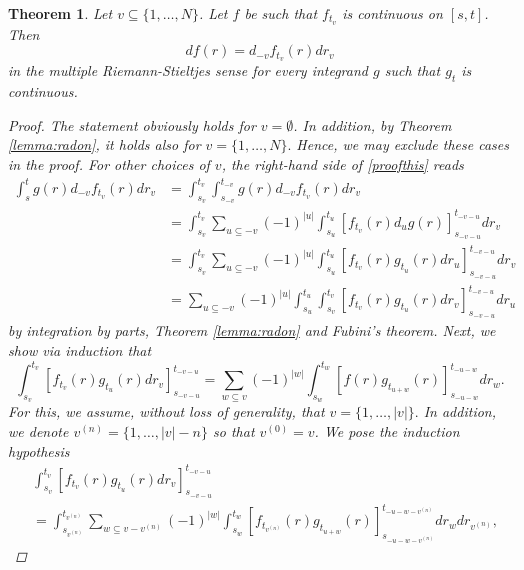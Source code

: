 \documentclass[english, a4paper, 12pt,reqno]{amsart}
\newtheorem{theorem}[defi]{Theorem}
\begin{document}
\begin{theorem}
\label{theorem:radon2}
Let $v\subseteq \{1,\dots,N\}$. Let $f$ be such that $f_{t_v}$ is continuous on $[s,t]$. Then
\begin{equation}
\label{proofthis}
d f(r) = d_{-v}f_{t_v}(r)dr_v
\end{equation}
in the multiple Riemann-Stieltjes sense for every integrand $g$ such that $g_t$ is continuous. 
\begin{proof}
The statement obviously holds for $v=\emptyset$. In addition, by Theorem \ref{lemma:radon}, it holds also for $v = \{1,\dots,N\}.$ Hence, we may exclude these cases in the proof. For other choices of $v$, the right-hand side of \eqref{proofthis} reads
\begin{equation}
\label{substitutehere}
\begin{split}
\int_s^t g(r) d_{-v} f_{t_v} (r) dr_v &= \int_{s_v}^{t_v} \int_{s_{-v}}^{t_{-v}} g(r) d_{-v} f_{t_v} (r) dr_v\\
&= \int_{s_v}^{t_v} \sum_{u\subseteq -v} (-1)^{|u|} \int_{s_u}^{t_u} \left[ f_{t_v}(r) d_u g(r)\right]_{s_{-v-u}}^{t_{-v-u}} dr_v\\
&= \int_{s_v}^{t_v} \sum_{u\subseteq -v} (-1)^{|u|} \int_{s_u}^{t_u} \left[ f_{t_v}(r) g_{t_u}(r) dr_u\right]_{s_{-v-u}}^{t_{-v-u}} dr_v \\
&= \sum_{u\subseteq -v} (-1)^{|u|} \int_{s_u}^{t_u}  \int_{s_v}^{t_v} \left[ f_{t_v}(r) g_{t_u}(r) dr_v\right]_{s_{-v-u}}^{t_{-v-u}} dr_u
\end{split}
\end{equation}
by integration by parts, Theorem \ref{lemma:radon} and Fubini's theorem. Next, we show via induction that
$$\int_{s_v}^{t_v} \left[ f_{t_v}(r) g_{t_u}(r) dr_v\right]_{s_{-v-u}}^{t_{-v-u}} = \sum_{w\subseteq v} (-1)^{|w|} \int_{s_w}^{t_w} \left[f(r) g_{t_{u+w}}(r)\right]_{s_{-u-w}}^{t_{-u-w}} dr_w. $$
For this, we assume, without loss of generality, that $v = \{1,\dots, |v|\}.$ In addition, we denote $v^{(n)} =\{1,\dots,|v|-n\}$ so that $v^{(0)} = v$. We pose the induction hypothesis
\begin{equation}
\label{inductionassumption}
\begin{split}
&\int_{s_v}^{t_v} \left[ f_{t_v}(r) g_{t_u}(r) dr_v\right]_{s_{-v-u}}^{t_{-v-u}}\\ 
&= \int_{s_{v^{(n)}}}^{t_{v^{(n)}}} \sum_{w\subseteq v- v^{(n)}} (-1)^{|w|} \int_{s_w}^{t_w}\left[f_{t_{v^{(n)}}}(r) g_{t_{u+w}}(r)\right]_{s_{-u-w-v^{(n)}}}^{t_{-u-w-v^{(n)}}}dr_w dr_{v^{(n)}},
\end{split}

\end{equation}
\end{proof}
\end{theorem}
\end{document}
